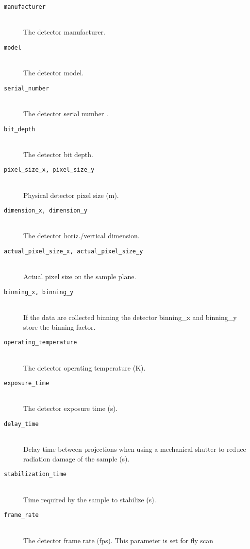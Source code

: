 \begin{description}
\item[\tt{manufacturer}] \hfill \\
{The detector manufacturer.}

\item[\tt{model}] \hfill \\
{The detector model.}

\item[\tt{serial\_number}] \hfill \\
{The detector serial number .}
     
\item[\tt{bit\_depth}] \hfill \\
{The detector bit depth.}

\item[\tt{pixel\_size\_x, pixel\_size\_y}] \hfill \\
{Physical detector pixel size (m).}

\item[\tt{dimension\_x, dimension\_y}] \hfill \\
{The detector horiz./vertical dimension.}

\item[\tt{actual\_pixel\_size\_x, actual\_pixel\_size\_y}] \hfill \\
{Actual pixel size on the sample plane.}


\item[\tt{binning\_x, binning\_y}] \hfill \\
{If the data are collected binning the detector binning\_x and binning\_y store the binning factor.}

\item[\tt{operating\_temperature}] \hfill \\
{The detector operating temperature (K).}

\item[\tt{exposure\_time}] \hfill \\
{The detector exposure time (s).}

\item[\tt{delay\_time}] \hfill \\
{Delay time between projections when using a mechanical shutter to reduce radiation damage of the sample (s).}

\item[\tt{stabilization\_time}] \hfill \\
{Time required by the sample to stabilize (s).}

\item[\tt{frame\_rate}] \hfill \\
{The detector frame rate (fps). This parameter is set for fly scan}


\end{description}
